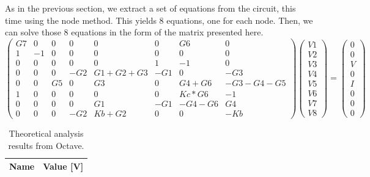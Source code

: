 As in the previous section, we extract a set of equations from the circuit, this time using the node method. This yields 8 equations, one for each node. Then, we can solve those 8 equations in the form of the matrix presented here.
\begin{equation}
\begin{pmatrix}
G7 & 0 & 0 & 0 & 0 & 0 & G6 & 0\\
1 & -1 & 0 & 0 & 0 & 0 & 0 & 0\\
0 & 0 & 0 & 0 & 0 & 1 & -1 & 0\\
0 & 0 & 0 & -G2 & G1+G2+G3 & -G1 & 0 & -G3\\
0 & 0 & G5 & 0 & G3 & 0 & G4+G6 & -G3-G4-G5\\
1 & 0 & 0 & 0 & 0 & 0& Kc*G6 & -1\\
0 & 0 & 0 & 0 & G1 & -G1 & -G4-G6 & G4\\
0 & 0 & 0 & -G2 & Kb+G2 & 0 & 0 & -Kb
\end{pmatrix}
\begin{pmatrix}
V1\\
V2\\
V3\\
V4\\
V5\\
V6\\
V7\\
V8
\end{pmatrix}
=
\begin{pmatrix}
0\\
0\\
V\\
0\\
I\\
0\\
0\\
0
\end{pmatrix}
\end{equation}

\begin{table}[h]
  \centering
  \begin{tabular}{|l|r|}
    \hline    
    {\bf Name} & {\bf Value [V]} \\ \hline
     
  \end{tabular}
  \caption{Theoretical analysis results from Octave.}
  \label{tab:node}
\end{table}
